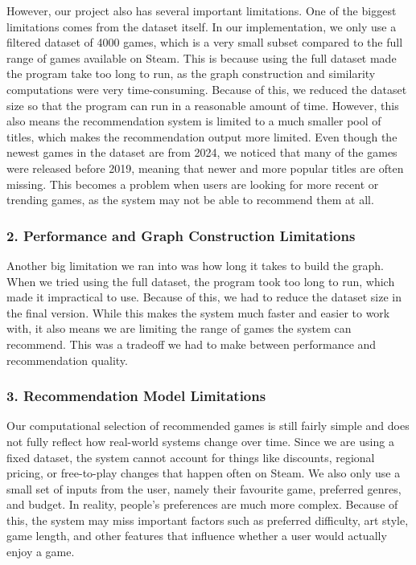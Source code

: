 \documentclass[fontsize=11pt]{article}
\begin{document}
However, our project also has several important limitations. One of the biggest limitations comes from the dataset itself. In our implementation, we only use a filtered dataset of 4000 games, which is a very small subset compared to the full range of games available on Steam. This is because using the full dataset made the program take too long to run, as the graph construction and similarity computations were very time-consuming. Because of this, we reduced the dataset size so that the program can run in a reasonable amount of time. However, this also means the recommendation system is limited to a much smaller pool of titles, which makes the recommendation output more limited. Even though the newest games in the dataset are from 2024, we noticed that many of the games were released before 2019, meaning that newer and more popular titles are often missing. This becomes a problem when users are looking for more recent or trending games, as the system may not be able to recommend them at all.

\subsubsection*{2. Performance and Graph Construction Limitations}

Another big limitation we ran into was how long it takes to build the graph. When we tried using the full dataset, the program took too long to run, which made it impractical to use. Because of this, we had to reduce the dataset size in the final version. While this makes the system much faster and easier to work with, it also means we are limiting the range of games the system can recommend. This was a tradeoff we had to make between performance and recommendation quality.

\subsubsection*{3. Recommendation Model Limitations}

Our computational selection of recommended games is still fairly simple and does not fully reflect how real-world systems change over time. Since we are using a fixed dataset, the system cannot account for things like discounts, regional pricing, or free-to-play changes that happen often on Steam. We also only use a small set of inputs from the user, namely their favourite game, preferred genres, and budget. In reality, people’s preferences are much more complex. Because of this, the system may miss important factors such as preferred difficulty, art style, game length, and other features that influence whether a user would actually enjoy a game.
\end{document}

